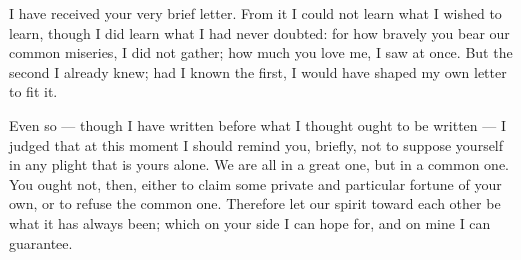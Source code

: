 

 I have received your very brief letter. From it I could not learn what I wished to learn, though I did learn what I had never doubted: for how bravely you bear our common miseries, I did not gather; how much you love me, I saw at once. But the second I already knew; had I known the first, I would have shaped my own letter to fit it.

 Even so --- though I have written before what I thought ought to be written --- I judged that at this moment I should remind you, briefly, not to suppose yourself in any plight that is yours alone. We are all in a great one, but in a common one. You ought not, then, either to claim some private and particular fortune of your own, or to refuse the common one. Therefore let our spirit toward each other be what it has always been; which on your side I can hope for, and on mine I can guarantee.
